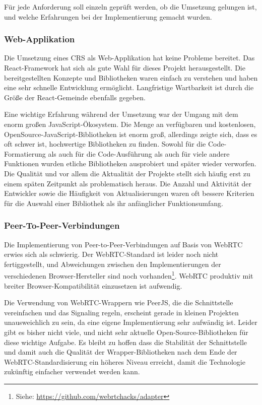 Für jede Anforderung soll einzeln geprüft werden, ob die Umsetzung gelungen ist, und welche Erfahrungen bei der Implementierung gemacht wurden.

\subsubsection*{Web-Applikation}

Die Umsetzung eines CRS als Web-Applikation hat keine Probleme bereitet. Das React-Framework hat sich als gute Wahl für dieses Projekt herausgestellt. Die bereitgestellten Konzepte und Bibliotheken waren einfach zu verstehen und haben eine sehr schnelle Entwicklung ermöglicht. Langfristige Wartbarkeit ist durch die Größe der React-Gemeinde ebenfalls gegeben.

Eine wichtige Erfahrung während der Umsetzung war der Umgang mit dem enorm großen JavaScript-Ökosystem. Die Menge an verfügbaren und kostenlosen, OpenSource-JavaScript-Bibliotheken ist enorm groß, allerdings zeigte sich, dass es oft schwer ist, hochwertige Bibliotheken zu finden. Sowohl für die Code-Formatierung als auch für die Code-Ausführung als auch für viele andere Funktionen wurden etliche Bibliotheken ausprobiert und später wieder verworfen. Die Qualität und vor allem die Aktualität der Projekte stellt sich häufig erst zu einem späten Zeitpunkt als problematisch heraus. Die Anzahl und Aktivität der Entwickler sowie die Häufigkeit von Aktualisierungen waren oft bessere Kriterien für die Auswahl einer Bibliothek als ihr anfänglicher Funktionsumfang.

\subsubsection*{Peer-To-Peer-Verbindungen}
Die Implementierung von Peer-to-Peer-Verbindungen auf Basis von WebRTC erwies sich als schwierig. Der WebRTC-Standard ist leider noch nicht fertiggestellt, und  Abweichungen zwischen den Implementierungen der verschiedenen Browser-Hersteller sind noch vorhanden\footnote{Siehe: \url{https://github.com/webrtchacks/adapter}}. WebRTC produktiv mit breiter Browser-Kompatibilität einzusetzen ist aufwendig.

Die Verwendung von WebRTC-Wrappern wie PeerJS, die die Schnittstelle vereinfachen und das Signaling regeln, erscheint gerade in kleinen Projekten unausweichlich zu sein, da eine eigene Implementierung sehr aufwändig ist. Leider gibt es bisher nicht viele, und nicht sehr aktuelle Open-Source-Bibliotheken für diese wichtige Aufgabe. Es bleibt zu hoffen dass die Stabilität der Schnittstelle und damit auch die Qualität der Wrapper-Bibliotheken nach dem Ende der WebRTC-Standardisierung ein höheres Niveau erreicht, damit die Technologie zukünftig einfacher verwendet werden kann.

